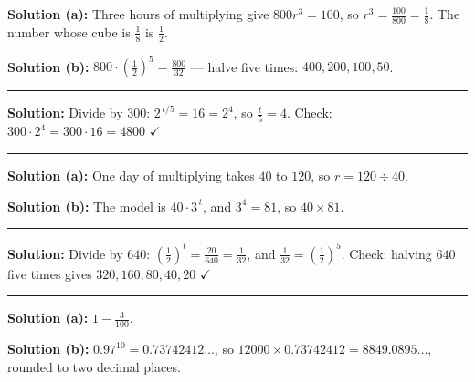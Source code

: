 \documentclass[12pt]{article}
\begin{document}

\textbf{Solution (a):} Three hours of multiplying give $800 r^3 = 100$, so $r^3 = \frac{100}{800} = \frac{1}{8}$. The number whose cube is $\frac{1}{8}$ is $\frac{1}{2}$. 

\textbf{Solution (b):} $800 \cdot \left(\frac{1}{2}\right)^{5} = \frac{800}{32}$ --- halve five times: $400, 200, 100, 50$. 

\vspace{0.2cm}\noindent\rule{\linewidth}{0.2pt}


\textbf{Solution:} Divide by $300$: $2^{\,t/5} = 16 = 2^4$, so $\frac{t}{5} = 4$. Check: $300 \cdot 2^4 = 300 \cdot 16 = 4800$ $\checkmark$ 

\vspace{0.2cm}\noindent\rule{\linewidth}{0.2pt}


\textbf{Solution (a):} One day of multiplying takes $40$ to $120$, so $r = 120 \div 40$. 

\textbf{Solution (b):} The model is $40 \cdot 3^{\,t}$, and $3^4 = 81$, so $40 \times 81$. 

\vspace{0.2cm}\noindent\rule{\linewidth}{0.2pt}


\textbf{Solution:} Divide by $640$: $\left(\frac{1}{2}\right)^{t} = \frac{20}{640} = \frac{1}{32}$, and $\frac{1}{32} = \left(\frac{1}{2}\right)^{5}$. Check: halving $640$ five times gives $320, 160, 80, 40, 20$ $\checkmark$ 

\vspace{0.2cm}\noindent\rule{\linewidth}{0.2pt}


\textbf{Solution (a):} $1 - \frac{3}{100}$. 

\textbf{Solution (b):} $0.97^{10} = 0.73742412\ldots$, so $12000 \times 0.73742412 = 8849.0895\ldots$, rounded to two decimal places. 
\end{document}
